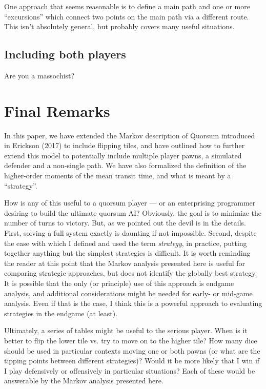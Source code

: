 \documentclass[letterpaper,11pt]{article}
\begin{document}
One approach that seems reasonable is to define a main path and one or more
``excursions'' which connect two points on the main path via a different route.
This isn't absolutely general, but probably covers many useful situations.

\subsection{Including both players}
Are you a massochist?

\section{Final Remarks}
In this paper, we have extended the Markov description of Quorsum introduced
in Erickson (2017) to include flipping tiles, and have outlined how to further
extend this model to potentially include multiple player pawns, a simulated
defender and a non-single path.  We have also formalized the definition of the
higher-order moments of the mean transit time, and what is meant by a 
``strategy''.  

How is any of this useful to a quorsum player --- or an enterprising programmer
desiring to build the ultimate quorsum AI?  Obviously, the goal is to minimize
the number of turns to victory.  But, as we pointed out the devil is in the 
details.  First, solving a full system exactly is daunting if not impossible.
Second, despite the ease with which I defined and used the term 
\textit{strategy}, in practice, putting together anything but the simplest
strategies is difficult.  It is worth reminding the reader at this point that
the Markov analysis presented here is useful for comparing strategic approaches,
but does not identify the globally best strategy.  It is possible that the 
only (or principle) use of this approach is endgame analysis, and additional
considerations might be needed for early- or mid-game analysis.  Even if that
is the case, I think this is a powerful approach to evaluating strategies
in the endgame (at least).

Ultimately, a series of tables might be useful to the serious player.  When is
it better to flip the lower tile vs. try to move on to the higher tile?  How
many dice should be used in particular contexts moving one or both pawns (or
what are the tipping points between different strategies)?  Would it be more
likely that I win if I play defensively or offensively in particular situations?
Each of these would be answerable by the Markov analysis presented here.
\end{document}

